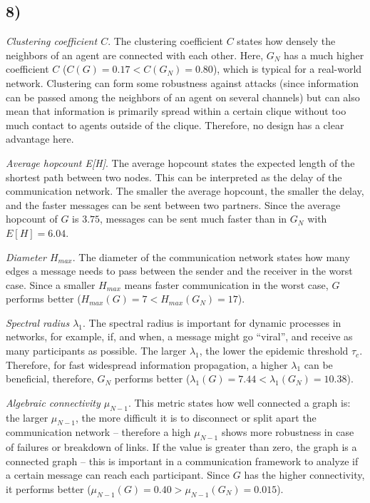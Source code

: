 \documentclass{article}
\begin{document}
\subsection*{8)}

\noindent\emph{Clustering coefficient $C$}. The clustering coefficient $C$
states how densely the neighbors of an agent are connected with each
other. Here, $G_N$ has a much higher coefficient $C$ ($C(G) = 0.17 <
C(G_N) = 0.80$), which is typical for a real-world network. Clustering
can form some robustness against attacks (since information can be
passed among the neighbors of an agent on several channels) but can
also mean that information is primarily spread within a certain clique
without too much contact to agents outside of the clique. Therefore,
no design has a clear advantage here.

\vspace*{0.5em}
\noindent
\emph{Average hopcount E[H]}. The average hopcount states the expected
length of the shortest path between two nodes. This can be interpreted
as the delay of the communication network. The smaller the average
hopcount, the smaller the delay, and the faster messages can be sent
between two partners. Since the average hopcount of $G$ is $3.75$,
messages can be sent much faster than in $G_N$ with $E[H] = 6.04$.

\vspace*{0.5em}
\noindent\emph{Diameter $H_{max}$}. The diameter of the communication network
states how many edges a message needs to pass between the sender and
the receiver in the worst case. Since a smaller $H_{max}$ means faster
communication in the worst case, $G$ performs better ($H_{max}(G) = 7
< H_{max}(G_N) = 17$).

\vspace*{0.5em}
\noindent\emph{Spectral radius $\lambda_1$}.
The spectral radius is important for dynamic processes in networks,
for example, if, and when, a message might go ``viral'', and receive
as many participants as possible. The larger $\lambda_1$, the lower
the epidemic threshold $\tau_c$. Therefore, for fast widespread
information propagation, a higher $\lambda_1$ can be beneficial,
therefore, $G_N$ performs better ($\lambda_1(G) = 7.44 <
\lambda_1(G_N) = 10.38$).

\vspace*{0.5em}
\noindent%
\emph{Algebraic connectivity $\mu_{N-1}$}. This metric states how well
connected a graph is: the larger $\mu_{N-1}$, the more difficult it is
to disconnect or split apart the communication network -- therefore a
high $\mu_{N-1}$ shows more robustness in case of failures or
breakdown of links. If the value is greater than zero, the graph is a
connected graph -- this is important in a communication framework to
analyze if a certain message can reach each participant. Since $G$ has
the higher connectivity, it performs better ($\mu_{N-1}(G) = 0.40 >
\mu_{N-1}(G_N) = 0.015$).
\end{document}
